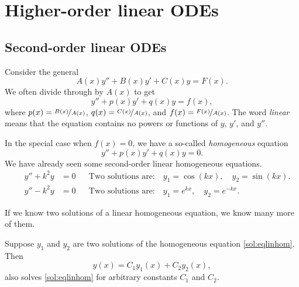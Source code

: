 \chapter{Higher-order linear ODEs} \label{ho:chapter}


\section{Second-order linear ODEs}
\label{solinear:section}


Consider the general
\emph{}
\begin{equation*}
A(x) y'' + B(x)y' + C(x)y = F(x) .
\end{equation*}
We often divide through by $A(x)$ to get
\begin{equation} \label{sol:eqlin}
y'' + p(x)y' + q(x)y = f(x) ,
\end{equation}
where $p(x) = \nicefrac{B(x)}{A(x)}$, $q(x) = \nicefrac{C(x)}{A(x)}$, and
$f(x) = \nicefrac{F(x)}{A(x)}$.
The word \emph{linear} means that the equation contains no powers or
functions of $y$, $y'$, and $y''$.

In the special case when $f(x) = 0$, we have a so-called
\emph{homogeneous}
equation
\begin{equation} \label{sol:eqlinhom}
y'' + p(x)y' + q(x)y = 0 .
\end{equation}
We have already seen some second-order linear homogeneous equations.
\begin{align*}
\qquad y'' + k^2 y & = 0 &
& \text{Two solutions are:} \quad y_1 = \cos (kx), \quad y_2 = \sin(kx) . \qquad \\
\qquad y'' - k^2 y & = 0 &
& \text{Two solutions are:} \quad y_1 = e^{kx}, \quad y_2 = e^{-kx} . \qquad
\end{align*}

If we know two solutions of a linear homogeneous equation, we know many
more of them.

\begin{theorem}[Superposition]
Suppose $y_1$ and $y_2$ are two solutions of the
homogeneous equation \eqref{sol:eqlinhom}.  Then 
\begin{equation*}
y(x) = C_1 y_1(x) + C_2 y_2(x) ,
\end{equation*}
also solves \eqref{sol:eqlinhom} for arbitrary constants $C_1$ and $C_2$.
\end{theorem}

